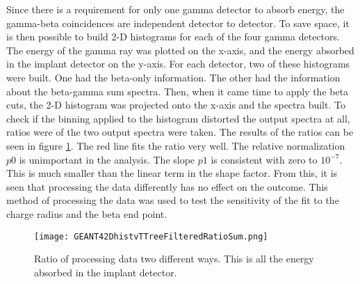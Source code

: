 \documentclass[../MaxHughesThesis.tex]{subfiles}
\begin{document}
Since there is a requirement for only one gamma detector to absorb energy, the gamma-beta coincidences are independent detector to detector.
To save space, it is then possible to build 2-D histograms for each of the four gamma detectors.
The energy of the gamma ray was plotted on the x-axis, and the energy absorbed in the implant detector on the y-axis. 
For each detector, two of these histograms were built.
One had the beta-only information.
The other had the information about the beta-gamma sum spectra.
Then, when it came time to apply the beta cuts, the 2-D histogram was projected onto the x-axis and the spectra built.
To check if the binning applied to the histogram distorted the output spectra at all, ratios were of the two output spectra were taken.
The results of the ratios can be seen in figure \ref{fig:histogramtottreeratio}.
The red line fits the ratio very well.
The relative normalization $\mathit{p0}$ is unimportant in the analysis.
The slope $\mathit{p1}$ is consistent with zero to $10^{-7}$.
This is much smaller than the linear term in the shape factor.
From this, it is seen that processing the data differently has no effect on the outcome.
This method of processing the data was used to test the sensitivity of the fit to the charge radius and the beta end point.

\begin{figure}
    \centerline{\texttt{[image: GEANT42DhistvTTreeFilteredRatioSum.png]}}
    \caption{Ratio of processing data two different ways.
    	     This is all the energy absorbed in the implant detector.}
    \label{fig:histogramtottreeratio}
\end{figure}
\end{document}
